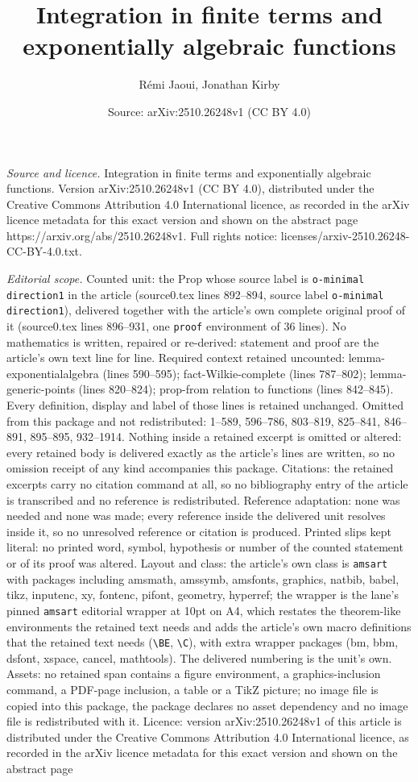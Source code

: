 \documentclass[10pt,a4paper]{amsart}
\title[Integration in finite terms and exponentially algebraic func]{Integration in finite terms and exponentially algebraic functions}
\author{R\'emi Jaoui, Jonathan Kirby}
\date{Source: arXiv:2510.26248v1 (CC BY 4.0)}
\begin{document}
\maketitle

\noindent\emph{Source and licence.} Integration in finite terms and exponentially algebraic functions. Version arXiv:2510.26248v1 (CC BY 4.0), distributed under the Creative Commons Attribution 4.0 International licence, as recorded in the arXiv licence metadata for this exact version and shown on the abstract page https://arxiv.org/abs/2510.26248v1. Full rights notice: licenses/arxiv-2510.26248-CC-BY-4.0.txt.\par\smallskip

\noindent\textit{Editorial scope.} Counted unit: the Prop whose source label is \texttt{o-minimal direction1} in the article (source0.tex lines 892--894, source label \texttt{o-minimal direction1}), delivered together with the article's own complete original proof of it (source0.tex lines 896--931, one \texttt{proof} environment of 36 lines). No mathematics is written, repaired or re-derived: statement and proof are the article's own text line for line. Required context retained uncounted: lemma-exponentialalgebra (lines 590--595); fact-Wilkie-complete (lines 787--802); lemma-generic-points (lines 820--824); prop-from relation to functions (lines 842--845). Every definition, display and label of those lines is retained unchanged. Omitted from this package and not redistributed: 1--589, 596--786, 803--819, 825--841, 846--891, 895--895, 932--1914. Nothing inside a retained excerpt is omitted or altered: every retained body is delivered exactly as the article's lines are written, so no omission receipt of any kind accompanies this package. Citations: the retained excerpts carry no citation command at all, so no bibliography entry of the article is transcribed and no reference is redistributed. Reference adaptation: none was needed and none was made; every reference inside the delivered unit resolves inside it, so no unresolved reference or citation is produced. Printed slips kept literal: no printed word, symbol, hypothesis or number of the counted statement or of its proof was altered. Layout and class: the article's own class is \texttt{amsart} with packages including amsmath, amssymb, amsfonts, graphics, natbib, babel, tikz, inputenc, xy, fontenc, pifont, geometry, hyperref; the wrapper is the lane's pinned \texttt{amsart} editorial wrapper at 10pt on A4, which restates the theorem-like environments the retained text needs and adds the article's own macro definitions that the retained text needs (\texttt{\textbackslash BE}, \texttt{\textbackslash C}), with extra wrapper packages (bm, bbm, dsfont, xspace, cancel, mathtools). The delivered numbering is the unit's own. Assets: no retained span contains a figure environment, a graphics-inclusion command, a PDF-page inclusion, a table or a TikZ picture; no image file is copied into this package, the package declares no asset dependency and no image file is redistributed with it. Licence: version arXiv:2510.26248v1 of this article is distributed under the Creative Commons Attribution 4.0 International licence, as recorded in the arXiv licence metadata for this exact version and shown on the abstract page 
\end{document}
